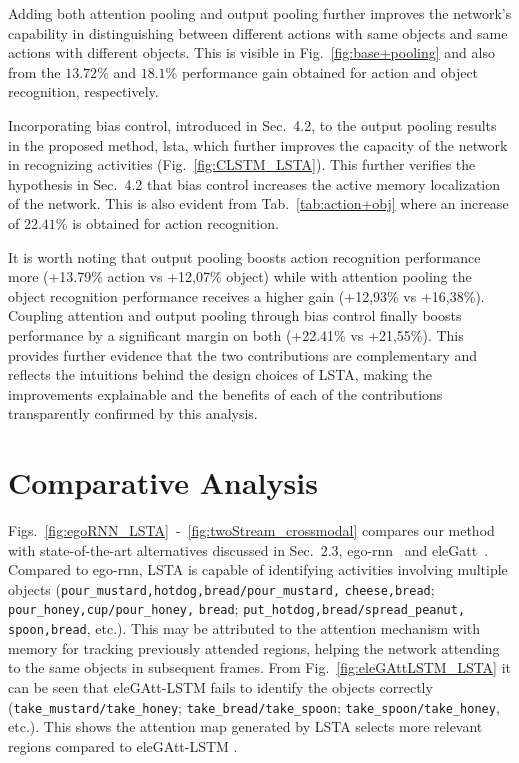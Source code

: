 \documentclass[10pt,twocolumn,letterpaper]{article}
\begin{document}
Adding both attention pooling and output pooling further improves the network's capability in distinguishing between different actions with same objects and same actions with different objects. This is visible in Fig.~\ref{fig:base+pooling} and also from the $13.72\%$ and $18.1\%$ performance gain obtained for action and object recognition, respectively. 

Incorporating bias control, introduced in Sec.~4.2, to the output pooling results in the proposed method, \acs{lsta}, which further improves the capacity of the network in recognizing activities (Fig.~\ref{fig:CLSTM_LSTA}). This further verifies the hypothesis in Sec.~4.2 that bias control increases the active memory localization of the network. This is also evident from Tab.~\ref{tab:action+obj} where an increase of $22.41\%$ is obtained for action recognition.


It is worth noting that output pooling boosts action recognition performance more (+13.79\% action vs +12,07\% object) while with attention pooling the object recognition performance receives a higher gain (+12,93\% vs +16,38\%). Coupling attention and output pooling through bias control finally boosts performance by a significant margin on both (+22.41\% vs +21,55\%).
This provides further evidence that the two contributions are complementary and reflects the intuitions behind the design choices of LSTA, making the improvements explainable and the benefits of each of the contributions transparently confirmed by this analysis.






	\section{Comparative Analysis}
	
	Figs.~\ref{fig:egoRNN_LSTA}~-~\ref{fig:twoStream_crossmodal} compares our method with state-of-the-art alternatives discussed in Sec.~2.3, ego-rnn~\cite{sudhakaran2018attention} and eleGatt~\cite{attention_eccv18}. Compared to ego-rnn, LSTA is capable of identifying activities involving multiple objects (\verb+pour_mustard,hotdog,bread/pour_mustard,+ \verb+cheese,bread+; \verb+pour_honey,cup/pour_honey,+ \verb+bread+; \verb+put_hotdog,bread/spread_peanut,+ \verb+spoon,bread+, etc.). This may be attributed to the attention mechanism with memory for tracking previously attended regions, helping the network attending to the same objects in subsequent frames. From Fig.~\ref{fig:eleGAttLSTM_LSTA} it can be seen that eleGAtt-LSTM fails to identify the objects correctly (\verb+take_mustard/take_honey+; \verb+take_bread/take_spoon+; \verb+take_spoon/take_honey+, etc.). This shows the attention map generated by LSTA selects more relevant regions compared to eleGAtt-LSTM .
	
\end{document}
